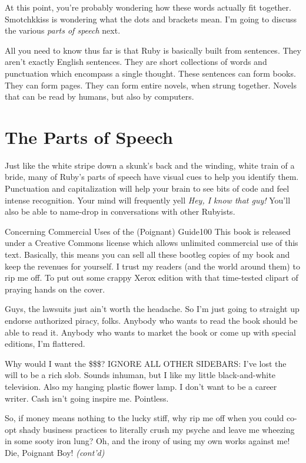 \documentclass[10pt,twoside]{report}
\begin{document}
At this point, you're probably wondering how these words actually fit
together.  Smotchkkiss is wondering what the dots and brackets mean.
I'm going to discuss the various {\em parts of speech} next.

All you need to know thus far is that Ruby is basically built from
sentences.  They aren't exactly English sentences.  They are short
collections of words and punctuation which encompass a single thought.
These sentences can form books.  They can form pages.  They can form
entire novels, when strung together. Novels that can be read by
humans, but also by computers.


\section{The Parts of Speech}


Just like the white stripe down a skunk's back and the winding, white
train of a bride, many of Ruby's parts of speech have visual cues to
help you identify them.  Punctuation and capitalization will help your
brain to see bits of code and feel intense recognition. Your mind will
frequently yell {\em Hey, I know that guy!}  You'll also be able to
name-drop in conversations with other Rubyists.

	\begin{sidebar}{Concerning Commercial Uses of the (Poignant) Guide}{100}
		This book is released under a Creative Commons license which allows unlimited commercial use of this text. Basically, this means you can sell all these bootleg copies of my book and keep the revenues for yourself. I trust my readers (and the world around them) to rip me off. To put out some crappy Xerox edition with that time-tested clipart of praying hands on the cover.\vspace{6pt}
		
		Guys, the lawsuits just ain't worth the headache. So I'm just going to straight up endorse authorized piracy, folks. Anybody who wants to read the book should be able to read it. Anybody who wants to market the book or come up with special editions, I'm flattered.\vspace{6pt}
		
		Why would I want the \$\$\$? IGNORE ALL OTHER SIDEBARS: I've lost the will to be a rich slob. Sounds inhuman, but I like my little black-and-white television. Also my hanging plastic flower lamp. I don't want to be a career writer. Cash isn't going inspire me. Pointless.\vspace{6pt}
		
		So, if money means nothing to the lucky stiff, why rip me off when you could co-opt shady business practices to literally crush my psyche and leave me wheezing in some sooty iron lung? Oh, and the irony of using my own works against me! Die, Poignant Boy! \textit{(cont'd)}
	\end{sidebar}
\end{document}
